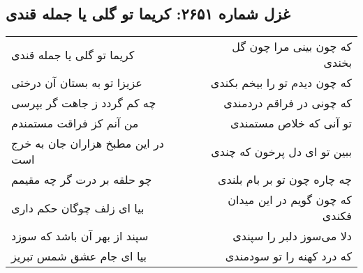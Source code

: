 \begin{center}
\section*{غزل شماره ۲۶۵۱: کریما تو گلی یا جمله قندی}
\label{sec:2651}
\begin{longtable}{l p{0.5cm} r}
کریما تو گلی یا جمله قندی
&&
که چون بینی مرا چون گل بخندی
\\
عزیزا تو به بستان آن درختی
&&
که چون دیدم تو را بیخم بکندی
\\
چه کم گردد ز جاهت گر بپرسی
&&
که چونی در فراقم دردمندی
\\
من آنم کز فراقت مستمندم
&&
تو آنی که خلاص مستمندی
\\
در این مطبخ هزاران جان به خرج است
&&
ببین تو ای دل پرخون که چندی
\\
چو حلقه بر درت گر چه مقیمم
&&
چه چاره چون تو بر بام بلندی
\\
بیا ای زلف چوگان حکم داری
&&
که چون گویم در این میدان فکندی
\\
سپند از بهر آن باشد که سوزد
&&
دلا می‌سوز دلبر را سپندی
\\
بیا ای جام عشق شمس تبریز
&&
که درد کهنه را تو سودمندی
\\
\end{longtable}
\end{center}
